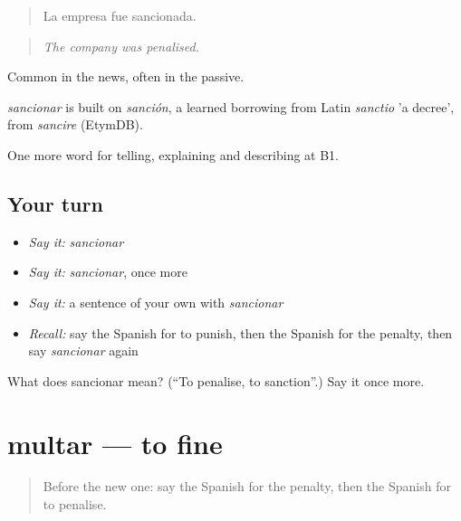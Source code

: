 \begin{quote}
La empresa fue sancionada.
\end{quote}

\begin{quote}
\emph{The company was penalised.}
\end{quote}

Common in the news, often in the passive.

\begin{cousinweb}
\emph{sancionar} is built on \emph{sanción}, a learned borrowing from Latin \emph{sanctio} 'a decree', from \emph{sancire} (EtymDB).
\end{cousinweb}

\begin{grammarlens}[title={What you've built}]
One more word for telling, explaining and describing at B1.
\end{grammarlens}

\subsection*{Your turn}
\begin{itemize}
\raggedright
  \item \emph{Say it:} \emph{sancionar}
  \item \emph{Say it:} \emph{sancionar}, once more
  \item \emph{Say it:} a sentence of your own with \emph{sancionar}
  \item \emph{Recall:} say the Spanish for to punish, then the Spanish for the penalty, then say \emph{sancionar} again
\end{itemize}

\begin{tcolorbox}[breakable,colback=teal!4,colframe=teal!35!black,title={Before you move on}]
What does sancionar mean? (\textquotedblleft{}To penalise, to sanction\textquotedblright{}.) Say it once more.
\end{tcolorbox}
\section[multar]{multar — to fine}

\label{lesson:ES-C623-multar}



\begin{quote}
Before the new one: say the Spanish for the penalty, then the Spanish for to penalise.
\end{quote}

